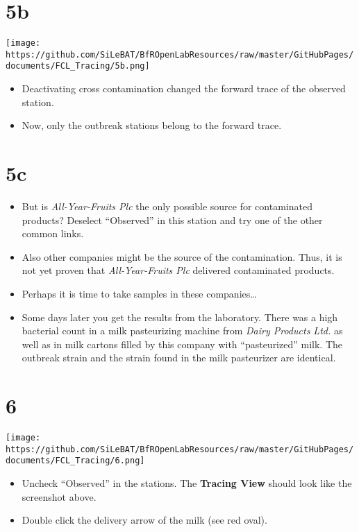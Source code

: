 \documentclass[10pt]{beamer}
\begin{document}
\section{5b}
\begin{frame}
	\begin{center}
  		\texttt{[image: https://github.com/SiLeBAT/BfROpenLabResources/raw/master/GitHubPages/documents/FCL\_Tracing/5b.png]}
	\end{center}
	\begin{itemize}
		\item Deactivating cross contamination changed the forward trace of the observed station.
		\item Now, only the outbreak stations belong to the forward trace.
	\end{itemize}
\end{frame}

\section{5c}
\begin{frame}
	\begin{itemize}
		\item But is \textit{All-Year-Fruits Plc} the only possible source for contaminated products? Deselect “Observed” in this station and try one of the other common links.
		\item Also other companies might be the source of the contamination. Thus, it is not yet proven that \textit{All-Year-Fruits Plc} delivered contaminated products.
		\item Perhaps it is time to take samples in these companies…
		\item Some days later you get the results from the laboratory. There was a high bacterial count in a milk pasteurizing machine from \textit{Dairy Products Ltd.} as well as in milk cartons filled by this company with “pasteurized” milk. The outbreak strain and the strain found in the milk pasteurizer are identical.
	\end{itemize}
\end{frame}

\section{6}
\begin{frame}
	\begin{center}
  		\texttt{[image: https://github.com/SiLeBAT/BfROpenLabResources/raw/master/GitHubPages/documents/FCL\_Tracing/6.png]}
	\end{center}
	\begin{itemize}
		\item Uncheck “Observed” in the stations. The \textbf{Tracing View} should look like the screenshot above.
		\item Double click the delivery arrow of the milk (see red oval).
	\end{itemize}
\end{frame}
\end{document}

